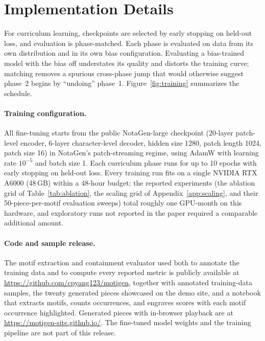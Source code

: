 \documentclass{article}
\begin{document}
\appendix

\section{Implementation Details}
\label{app:curriculum_implementation}

For curriculum learning, checkpoints are selected by early stopping on held-out loss, and evaluation is phase-matched. Each phase is evaluated on data from its own distribution and in its own bias configuration. Evaluating a bias-trained model with the bias off understates its quality and distorts the training curve; matching removes a spurious cross-phase jump that would otherwise suggest phase~2 begins by ``undoing'' phase~1. Figure~\ref{fig:training} summarizes the schedule.

\paragraph{Training configuration.}
All fine-tuning starts from the public NotaGen-large checkpoint (20-layer patch-level encoder, 6-layer character-level decoder, hidden size 1280, patch length 1024, patch size 16) in NotaGen's patch-streaming regime, using AdamW with learning rate $10^{-5}$ and batch size 1. Each curriculum phase runs for up to 10 epochs with early stopping on held-out loss. Every training run fits on a single NVIDIA RTX A6000 (48\,GB) within a 48-hour budget; the reported experiments (the ablation grid of Table~\ref{tab:ablation}, the scaling grid of Appendix~\ref{app:scaling}, and their 50-piece-per-motif evaluation sweeps) total roughly one GPU-month on this hardware, and exploratory runs not reported in the paper required a comparable additional amount.

\paragraph{Code and sample release.}
The motif extraction and containment evaluator used both to annotate the training data and to compute every reported metric is publicly available at \url{https://github.com/cpyang123/motigen}, together with annotated training-data samples, the twenty generated pieces showcased on the demo site, and a notebook that extracts motifs, counts occurrences, and engraves scores with each motif occurrence highlighted. Generated pieces with in-browser playback are at \url{https://motigen-site.github.io/}. The fine-tuned model weights and the training pipeline are not part of this release.
\end{document}
